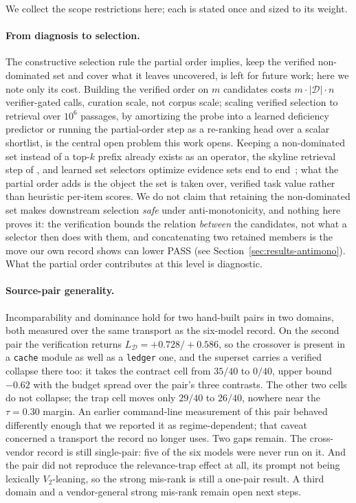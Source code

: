 \documentclass[11pt]{article}
\theoremstyle{plain}
\theoremstyle{definition}
\theoremstyle{remark}
\newcommand{\Dcal}{\mathcal{D}}
\begin{document}
We collect the scope restrictions here; each is stated once and sized to its weight.

\paragraph{From diagnosis to selection.} The constructive selection rule the partial order
implies, keep the verified non-dominated set and cover what it leaves uncovered, is left for
future work; here we note only its cost. Building the verified order on $m$ candidates costs
$m\!\cdot\!|\Dcal|\!\cdot\!n$ verifier-gated calls, curation scale, not corpus scale; scaling
verified selection to retrieval over $10^6$ passages, by amortizing the probe into a learned
deficiency predictor or running the partial-order step as a re-ranking head over a scalar
shortlist, is the central open problem this work opens. Keeping a non-dominated set instead of a
top-$k$ prefix already exists as an operator, the skyline retrieval step of \citet{skylinerag2026}, and learned
set selectors optimize evidence sets end to end~\citep{optiset2026,rank4gen2026}; what the partial
order adds is the object the set is taken over, verified task value rather than heuristic per-item
scores. We do not claim that retaining the non-dominated set makes downstream selection
\emph{safe} under anti-monotonicity, and nothing here proves it: the verification bounds the
relation \emph{between} the candidates, not what a selector then does with them, and
concatenating two retained members is the move our own record shows can lower PASS
(see Section~\ref{sec:results-antimono}). What the partial order contributes at this level is
diagnostic.

\paragraph{Source-pair generality.} Incomparability and dominance hold for two hand-built pairs
in two domains, both measured over the same transport as the six-model record. On the second
pair the verification returns $L_{\Dcal}=+0.728/+0.586$, so the crossover is present in a
\texttt{cache} module as well as a \texttt{ledger} one, and the superset carries a verified
collapse there too: it takes the contract cell from $35/40$ to $0/40$, upper bound $-0.62$ with
the budget spread over the pair's three contrasts. The other two cells do not collapse; the trap
cell moves only $29/40$ to $26/40$, nowhere near the $\tau=0.30$ margin. An earlier command-line
measurement of this pair behaved differently enough that we reported it as regime-dependent; that
caveat concerned a transport the record no longer uses. Two gaps remain. The cross-vendor record
is still single-pair: five of the six models were never run on it. And the pair did not reproduce
the relevance-trap effect at all, its prompt not being lexically $V_2$-leaning, so the strong
mis-rank is still a one-pair result. A third
domain and a vendor-general strong mis-rank remain open next steps.
\end{document}

